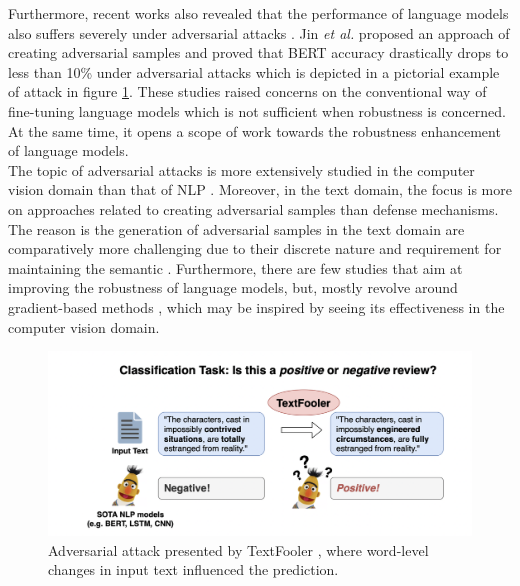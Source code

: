 \documentclass[%
	BCOR=8mm, %
	DIV=12,
	toc=bibliography, %
	toc=listof, %
	oneside, %
	egregdoesnotlikesansseriftitles, %
	]{scrbook}
\begin{document}
Furthermore,  recent works also revealed that the performance of language models also suffers severely under adversarial attacks \cite{li_bert-attack_2020,garg_bae_2020,moradi_evaluating_2021-1}. Jin \textit{et al.} \cite{jin_is_2020}  proposed an approach of creating adversarial samples and proved that BERT accuracy drastically drops to less than 10\% under adversarial attacks  which is depicted in a pictorial example of attack in figure \ref{diag:ExampleAdversarial}. These studies raised concerns on the conventional way of fine-tuning language models which is not sufficient when robustness is concerned. At the same time, it opens a scope of work towards the robustness enhancement of language models.\\
The topic of adversarial attacks is more extensively studied in the computer vision domain than that of NLP \cite{wang_towards_2021}. Moreover, in the text domain, the focus is more on approaches related to creating adversarial samples than defense mechanisms. The reason is the generation of adversarial samples in the text domain are comparatively more challenging due to their discrete nature and requirement for maintaining the semantic \cite{li_bert-attack_2020}. Furthermore, there are few studies that aim at improving the robustness of language models, but, mostly revolve around gradient-based methods \cite{zhu_at-bert_2021,miyato_adversarial_2017,jiang_smart_2020-1}, which may be inspired by seeing its effectiveness in the computer vision domain.\\
\begin{figure}[H]
    \centering
    \includegraphics[width=.85\textwidth]{img/Introduction-Fig-1.png}
    \caption[Example of adversarial attack in text-domain]{Adversarial attack presented by TextFooler \cite{jin_is_2020}, where word-level changes in input text influenced the prediction.}
    \label{diag:ExampleAdversarial}
\end{figure}
\end{document}
